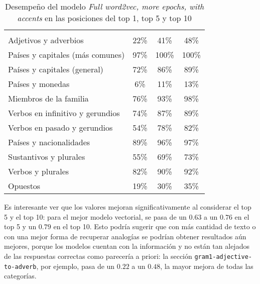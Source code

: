 \begin{table}[!h]
    \setlength\tabcolsep{4pt}
    \begin{tabularx}{\textwidth}{Y*{3}{c}}
        \toprule
        \midrule
         &  &  & \\
        Adjetivos y adverbios & 22\% & 41\% & 48\%\\
        Países y capitales (más comunes) & 97\% & 100\% & 100\%\\
        Países y capitales (general) & 72\% & 86\% & 89\%\\
        Países y monedas & 6\% & 11\% & 13\%\\
        Miembros de la familia & 76\% & 93\% & 98\%\\
        Verbos en infinitivo y gerundios & 74\% & 87\% & 89\%\\
        Verbos en pasado y gerundios & 54\% & 78\% & 82\%\\
        Países y nacionalidades & 89\% & 96\% & 97\%\\
        Sustantivos y plurales & 55\% & 69\% & 73\%\\
        Verbos y plurales & 82\% & 90\% & 92\%\\
        Opuestos & 19\% & 30\% & 35\%\\
        \midrule
        \bottomrule
    \end{tabularx}
    \caption{Desempeño del modelo \textit{Full word2vec, more epochs, with accents} en las
             posiciones del top 1, top 5 y top 10}
    \label{table:top_1_5_10}
\end{table}


Es interesante ver que los valores mejoran significativamente al considerar el top 5 y el top 10:
para el mejor modelo vectorial, se pasa de un $0.63$ a un $0.76$ en el top 5 y un $0.79$ en el top
10. Esto podría sugerir que con más cantidad de texto o con una mejor forma de recuperar analogías
se podrían obtener resultados aún mejores, porque los modelos cuentan con la información y no están
tan alejados de las respuestas correctas como parecería a priori: la sección
\texttt{gram1-adjective-to-adverb}, por ejemplo, pasa de un $0.22$ a un $0.48$, la mayor mejora de
todas las categorías.


